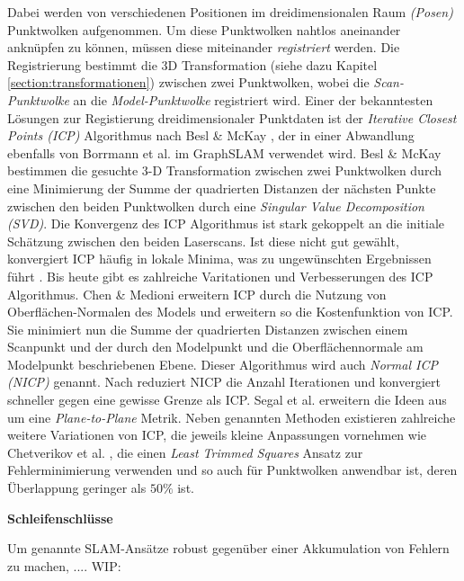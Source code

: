 Dabei werden von verschiedenen Positionen im dreidimensionalen Raum \emph{(Posen)} Punktwolken aufgenommen. Um diese Punktwolken nahtlos aneinander anknüpfen zu können, müssen diese miteinander \emph{registriert} werden. Die Registrierung bestimmt die 3D Transformation (siehe dazu Kapitel \ref{section:transformationen}) zwischen zwei Punktwolken, wobei die \emph{Scan-Punktwolke} an die \emph{Model-Punktwolke} registriert wird.
Einer der bekanntesten Lösungen zur Registierung dreidimensionaler Punktdaten ist der \emph{Iterative Closest Points (ICP)} Algorithmus nach Besl \& McKay \cite{besl1992method}, der in einer Abwandlung ebenfalls von Borrmann et al. im GraphSLAM \cite{borrmann2008globally} verwendet wird.
Besl \& McKay \cite{besl1992method} bestimmen die gesuchte 3-D Transformation zwischen zwei Punktwolken durch eine Minimierung der Summe der quadrierten Distanzen der nächsten Punkte zwischen den beiden Punktwolken durch eine \emph{Singular Value Decomposition (SVD)}.
Die Konvergenz des ICP Algorithmus ist stark gekoppelt an die initiale Schätzung zwischen den beiden Laserscans. Ist diese nicht gut gewählt, konvergiert ICP häufig in lokale Minima, was zu ungewünschten Ergebnissen führt \cite{he2017iterative}. 
Bis heute gibt es zahlreiche Varitationen und Verbesserungen des ICP Algorithmus.
Chen \& Medioni \cite{chen1992object} erweitern ICP durch die Nutzung von Oberflächen-Normalen des Models und erweitern so die Kostenfunktion von ICP. Sie minimiert nun die Summe der quadrierten Distanzen zwischen einem Scanpunkt und der durch den Modelpunkt und die Oberflächennormale am Modelpunkt beschriebenen Ebene. Dieser Algorithmus wird auch \emph{Normal ICP (NICP)} genannt. 
Nach \cite{he2017iterative} reduziert NICP die Anzahl Iterationen und konvergiert schneller  gegen eine gewisse Grenze als ICP.
Segal et al. \cite{segal2009generalized} erweitern die Ideen aus \cite{chen1992object} um eine \emph{Plane-to-Plane} Metrik.
Neben genannten Methoden existieren zahlreiche weitere Variationen von ICP, die jeweils kleine Anpassungen vornehmen wie Chetverikov et al. \cite{chetverikov2005robust}, die einen \emph{Least Trimmed Squares} Ansatz zur Fehlerminimierung verwenden und so auch für Punktwolken anwendbar ist, deren Überlappung geringer als $50\%$ ist.

\textbf{Schleifenschlüsse}

Um genannte SLAM-Ansätze robust gegenüber einer Akkumulation von Fehlern zu machen, .... WIP:

